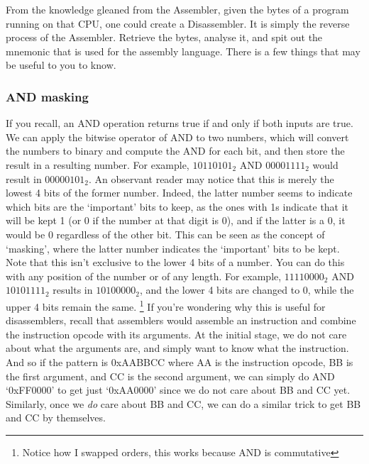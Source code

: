 \documentclass[twocolumn, a4paper,12pt]{article}
\begin{document}
From the knowledge gleaned from the Assembler, given the bytes of a program running
on that CPU, one could create a Disassembler. It is simply the reverse process of the Assembler.
Retrieve the bytes, analyse it, and spit out the mnemonic that is used for the assembly language.
There is a few things that may be useful to you to know.

\subsubsection{AND masking}
If you recall, an AND operation returns true if and only if both inputs are true.
We can apply the bitwise operator of AND to two numbers, which will convert the numbers to binary and 
compute the AND for each bit, and then store the result in a resulting number. For example, $10110101_{2}$ AND $00001111_{2}$
would result in $00000101_{2}$. An observant reader may notice that this is merely the lowest 4 bits of the former number.
Indeed, the latter number seems to indicate which bits are the `important' bits to keep, as the ones with 1s indicate that it will
be kept 1 (or 0 if the number at that digit is 0), and if the latter is a 0, it would be 0 regardless of the other bit.
This can be seen as the concept of `masking', where the latter number indicates the `important' bits to be kept. Note that this
isn't exclusive to the lower 4 bits of a number. You can do this with any position of the number or of any length. For example,
$11110000_{2}$ AND $10101111_{2}$ results in $10100000_{2}$, and the lower 4 bits are changed to 0, while the upper 4 bits remain the same.
\footnote{Notice how I swapped orders, this works because AND is commutative} If you're wondering why this is useful for disassemblers,
recall that assemblers would assemble an instruction and combine the instruction opcode with its arguments. At the initial stage,
we do not care about what the arguments are, and simply want to know what the instruction. And so if the pattern is 0xAABBCC where AA 
is the instruction opcode, BB is the first argument, and CC is the second argument, we can simply do AND `0xFF0000' to get just
`0xAA0000' since we do not care about BB and CC yet. Similarly, once we \textit{do} care about BB and CC, we can do a similar trick
to get BB and CC by themselves.
\end{document}
